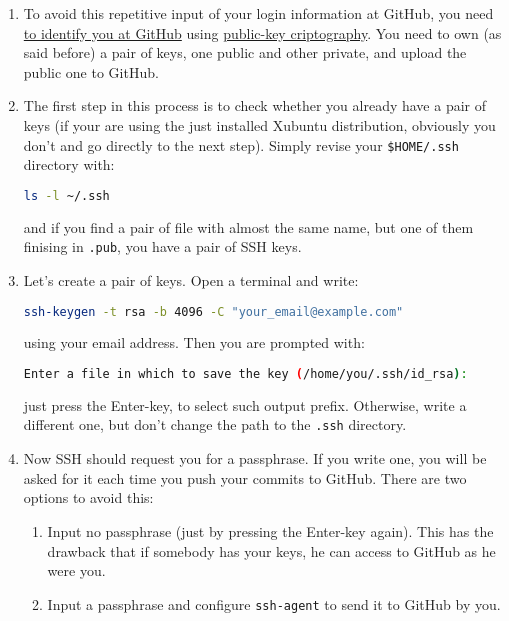 \begin{enumerate}
\item To avoid this repetitive input of your login information at
  GitHub, you need
  \href{https://docs.github.com/en/github/authenticating-to-github/connecting-to-github-with-ssh}{to
    identify you at GitHub} using
  \href{https://en.wikipedia.org/wiki/Public-key_cryptography}{public-key
    criptography}. You need to own (as said before) a pair of keys,
  one public and other private, and upload the public one to GitHub.
  
\item The first step in this process is to check whether you already
  have a pair of keys (if your are using the just installed Xubuntu
  distribution, obviously you don't and go directly to the next
  step). Simply revise your \texttt{\$HOME/.ssh} directory with:

  \begin{lstlisting}[language=bash]
    ls -l ~/.ssh
  \end{lstlisting}

  and if you find a pair of file with almost the same name, but one of
  them finising in \texttt{.pub}, you have a pair of SSH keys.

\item Let's create a pair of keys. Open a terminal and write:

  \begin{lstlisting}[language=bash]
    ssh-keygen -t rsa -b 4096 -C "your_email@example.com"
  \end{lstlisting}

  using your email address. Then you are prompted with:

  \begin{lstlisting}[language=bash]
    Enter a file in which to save the key (/home/you/.ssh/id_rsa):
  \end{lstlisting}

  just press the Enter-key, to select such output prefix. Otherwise,
  write a different one, but don't change the path to the
  \texttt{.ssh} directory.

\item Now SSH should request you for a passphrase. If you write one,
  you will be asked for it each time you push your commits to
  GitHub. There are two options to avoid this:

  \begin{enumerate}
  \item Input no passphrase (just by pressing the Enter-key
    again). This has the drawback that if somebody has your keys, he
    can access to GitHub as he were you.
  \item Input a passphrase and configure \texttt{ssh-agent} to send it
    to GitHub by you.
  \end{enumerate}


\end{enumerate}
